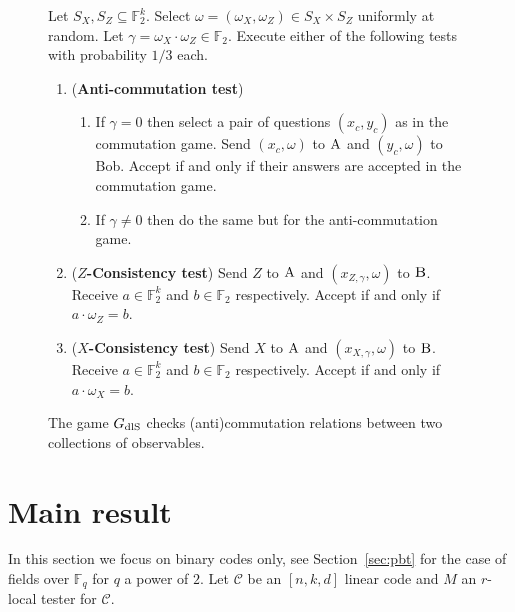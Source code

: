 \documentclass[11pt]{article}
\theoremstyle{definition}
\newcommand{\code}{\mathcal{C}}
\newcommand{\field}{\mathbb{F}_2}
\newcommand{\dlS}{\ensuremath{\rm dlS}}
\newcommand{\F}{\ensuremath{\mathbb{F}}}
\newcommand{\labelstyle}[1]{\ensuremath{\textsc{#1}}\xspace}
\newcommand{\alice}{\labelstyle{A}}
\newcommand{\bob}{\labelstyle{B}}
\newenvironment{gamespec}{
  \begin{mdframed}[style=figstyle]}{
  \end{mdframed}}
\begin{document}
\begin{figure}[!htbp]
  \centering
  \begin{gamespec}
Let $S_X,S_Z\subseteq \field^k$.  Select $\omega = (\omega_X,\omega_Z)\in S_X \times S_Z $ uniformly at random. Let $\gamma = \omega_X \cdot \omega_Z \in \field$. Execute either of the following tests with probability $1/3$ each. 
    \begin{enumerate}
      \setlength\itemsep{1pt}
    \item (\textbf{Anti-commutation test}) 
		\begin{enumerate}
		\item If $\gamma=0$ then select a pair of questions $(x_c,y_c)$ as in the commutation game. Send $(x_c,\omega)$ to $\alice$ and $(y_c,\omega)$ to Bob. Accept if and only if their answers are accepted in the commutation game. 
		\item If $\gamma\neq 0$ then do the same but for the anti-commutation game. 
		\end{enumerate} 
		 \item (\textbf{$Z$-Consistency test}) Send $Z$ to $\alice$ and $(x_{Z,\gamma},\omega)$ to $\bob$. Receive $a\in \field^k$ and $b\in \field$ respectively. Accept if and only if $a\cdot \omega_Z=b$. 
		 \item (\textbf{$X$-Consistency test}) Send $X$ to $\alice$ and $(x_{X,\gamma},\omega)$ to $\bob$. Receive $a\in \field^k$ and $b\in \field$ respectively. Accept if and only if $a\cdot \omega_X=b$. 
    \end{enumerate}
  \end{gamespec}
  \caption{The game $G_{\dlS}$ checks (anti)commutation relations between two collections of observables.}
  \label{fig:dlS}
\end{figure}

\section{Main result}

In this section we focus on binary codes only, see Section~\ref{sec:pbt} for the case of fields over $\F_q$ for $q$ a power of $2$. Let $\code$ be an $[n,k,d]$ linear code and $M$ an $r$-local tester for $\code$. 
\end{document}
